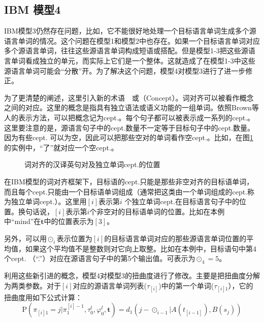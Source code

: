 \vspace{-2em}
\subsection{IBM 模型4}

\parinterval IBM模型3仍然存在问题，比如，它不能很好地处理一个目标语言单词生成多个源语言单词的情况。这个问题在模型1和模型2中也存在。如果一个目标语言单词对应多个源语言单词，往往这些源语言单词构成短语或搭配。但是模型1-3把这些源语言单词看成独立的单元，而实际上它们是一个整体。这就造成了在模型1-3中这些源语言单词可能会``分散''开。为了解决这个问题，模型4对模型3进行了进一步修正。

\parinterval 为了更清楚的阐述，这里引入新的术语\ \dash \ {\small{}}或{\small{}}（Concept）。词对齐可以被看作概念之间的对应。这里的概念是指具有独立语法或语义功能的一组单词。依照Brown等人的表示方法\cite{Peter1993The}，可以把概念记为cept.。每个句子都可以被表示成一系列的cept.。这里要注意的是，源语言句子中的cept.数量不一定等于目标句子中的cept.数量。因为有些cept. 可以为空，因此可以把那些空对的单词看作空cept.。比如，在图\ref{fig:3-32}的实例中，``了''就对应一个空cept.。
\vspace{3em}

\begin{figure}[htp]
    \centering

   \caption{词对齐的汉译英句对及独立单词cept.的位置}
   \label{fig:3-32}
\end{figure}

\parinterval 在IBM模型的词对齐框架下，目标语的cept.只能是那些非空对齐的目标语单词，而且每个cept.只能由一个目标语单词组成（通常把这类由一个单词组成的cept.称为独立单词cept.）。这里用$[i]$表示第$i$ 个独立单词cept.在目标语言句子中的位置。换句话说，$[i]$表示第$i$个非空对的目标语单词的位置。比如在本例中``mind''在$\mathbf{t}$中的位置表示为$[3]$。

\parinterval 另外，可以用$\odot_{i}$表示位置为$[i]$的目标语言单词对应的那些源语言单词位置的平均值，如果这个平均值不是整数则对它向上取整。比如在本例中，目标语句中第4个cept. （``.''）对应在源语言句子中的第5个输出值。可表示为${\odot}_{4}=5$。

\parinterval 利用这些新引进的概念，模型4对模型3的扭曲度进行了修改。主要是把扭曲度分解为两类参数。对于$[i]$对应的源语言单词列表($\tau_{[i]}$)中的第一个单词($\tau_{[i]1}$），它的扭曲度用如下公式计算：
\begin{equation}
\textrm{P}(\pi_{[i]1}=j|{\pi}_1^{[i]-1},{\tau}_0^l,{\varphi}_0^l,\mathbf{t})=d_{1}(j-{\odot}_{i-1}|A(t_{[i-1]}),B(s_j))
\label{eq:3-70}
\end{equation}

